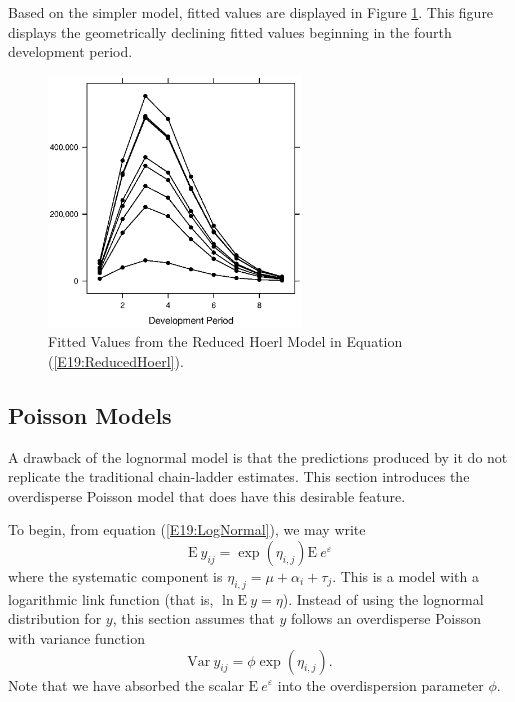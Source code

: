 Based on the simpler model, fitted values are displayed in Figure
\ref{F19:HoerlFittedValues}. This figure displays the geometrically
declining fitted values beginning in the fourth development period.



\begin{figure}[htp]
    \includegraphics[width=0.6\textwidth]{Chapter19Triangles/F19HoerlFittedValues.eps}
  \caption{\label{F19:HoerlFittedValues} Fitted Values from the Reduced Hoerl Model in Equation (\ref{E19:ReducedHoerl}).}
\end{figure}

\linejed

\subsection{Poisson Models}\label{S19:Poisson}

A drawback of the lognormal model is that the predictions produced
by it do not replicate the traditional chain-ladder estimates. This
section introduces the overdisperse Poisson model that does have
this desirable feature.

To begin, from equation (\ref{E19:LogNormal}), we may write
\begin{equation*}
\mathrm{E}~ y_{ij} = \exp(\eta_{i,j}) \mathrm{E}~ e^{\varepsilon}
\end{equation*}
where the systematic component is $\eta_{i,j} = \mu + \alpha_i +
\tau_j$. This is a model with a logarithmic link function (that is,
$\ln \mathrm{E}~y = \eta$). Instead of using the lognormal
distribution for $y$, this section assumes that $y$ follows an
overdisperse Poisson with variance function
\begin{equation*}
\mathrm{Var}~ y_{ij} = \phi \exp(\eta_{i,j}).
\end{equation*}
Note that we have absorbed the scalar $\mathrm{E}~ e^{\varepsilon}$
into the overdispersion parameter $\phi$.

